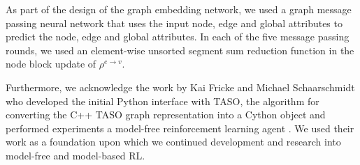 As part of the design of the graph embedding network, we used a graph message passing neural network \cite{gilmer2017neural} that uses the input node, edge and global attributes to predict the node, edge and global attributes. In each of the five message passing rounds, we used an element-wise unsorted segment sum reduction function in the node block update of $\rho^{e\rightarrow v}$.

Furthermore, we acknowledge the work by Kai Fricke and Michael Schaarschmidt who developed the initial Python interface with TASO, the algorithm for converting the C++ TASO graph representation into a Cython object and performed experiments a model-free reinforcement learning agent \cite{xflowrl2019}. We used their work as a foundation upon which we continued development and research into model-free and model-based RL.
